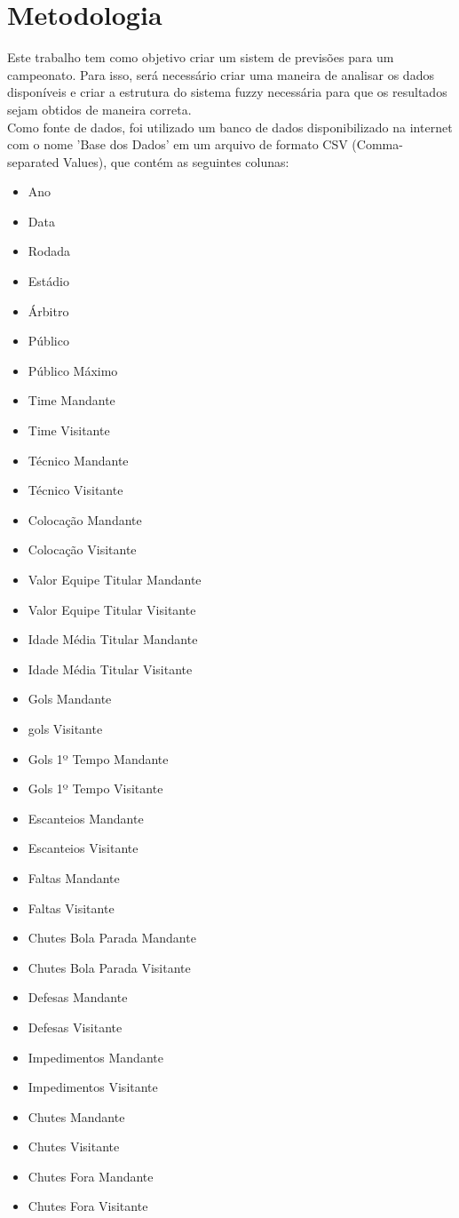 \documentclass[conference]{IEEEtran}
\begin{document}
\section{Metodologia}
\indent Este trabalho tem como objetivo criar um sistem de previsões para um 
campeonato. Para isso, será necessário criar uma maneira de analisar os dados 
disponíveis e criar a estrutura do sistema fuzzy necessária para que os 
resultados sejam obtidos de maneira correta.\\
\indent Como fonte de dados, foi utilizado um banco de dados disponibilizado na 
internet com o nome 'Base dos Dados' em um arquivo de formato CSV 
(Comma-separated Values), que contém as seguintes colunas:
\begin{itemize}
    \item Ano
    \item Data
    \item Rodada
    \item Estádio
    \item Árbitro
    \item Público
    \item Público Máximo
    \item Time Mandante
    \item Time Visitante
    \item Técnico Mandante
    \item Técnico Visitante
    \item Colocação Mandante
    \item Colocação Visitante
    \item Valor Equipe Titular Mandante
    \item Valor Equipe Titular Visitante
    \item Idade Média Titular Mandante
    \item Idade Média Titular Visitante
    \item Gols Mandante
    \item gols Visitante
    \item Gols 1º Tempo Mandante
    \item Gols 1º Tempo Visitante
    \item Escanteios Mandante
    \item Escanteios Visitante
    \item Faltas Mandante
    \item Faltas Visitante
    \item Chutes Bola Parada Mandante
    \item Chutes Bola Parada Visitante
    \item Defesas Mandante
    \item Defesas Visitante
    \item Impedimentos Mandante
    \item Impedimentos Visitante
    \item Chutes Mandante
    \item Chutes Visitante
    \item Chutes Fora Mandante
    \item Chutes Fora Visitante
\end{itemize}
\end{document}
